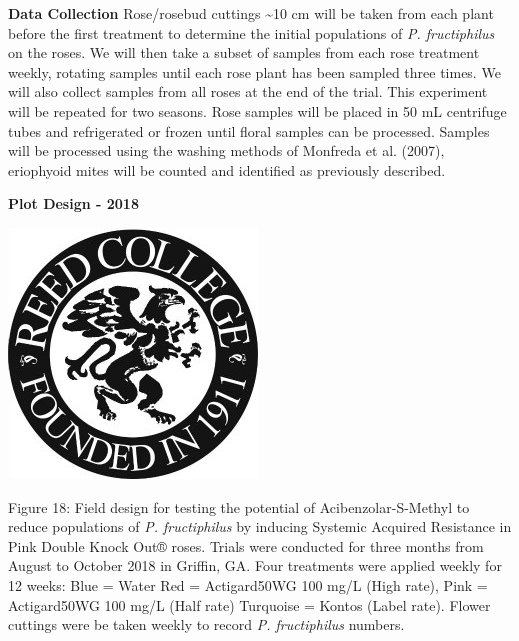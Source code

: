 \documentclass[12pt,final,CPage]{ufthesis}
\begin{document}
{  \textbf{Data Collection}
  Rose/rosebud cuttings \textasciitilde10 cm will be taken from each plant before the first treatment to determine the initial populations of \emph{P. fructiphilus} on the roses. We will then take a subset of samples from each rose treatment weekly, rotating samples until each rose plant has been sampled three times. We will also collect samples from all roses at the end of the trial. This experiment will be repeated for two seasons. Rose samples will be placed in 50 mL centrifuge tubes and refrigerated or frozen until floral samples can be processed. Samples will be processed using the washing methods of Monfreda et al. (2007), eriophyoid mites will be counted and identified as previously described.

  \textbf{Plot Design - 2018}
  \begin{center}\includegraphics[width=0.8\linewidth]{figure/reed} \end{center}

  Figure 18: Field design for testing the potential of Acibenzolar-S-Methyl to reduce populations of \emph{P. fructiphilus} by inducing Systemic Acquired Resistance in Pink Double Knock Out® roses. Trials were conducted for three months from August to October 2018 in Griffin, GA. Four treatments were applied weekly for 12 weeks: Blue = Water Red = Actigard50WG 100 mg/L (High rate), Pink = Actigard50WG 100 mg/L (Half rate) Turquoise = Kontos (Label rate). Flower cuttings were be taken weekly to record \emph{P. fructiphilus} numbers.

}
\end{document}

